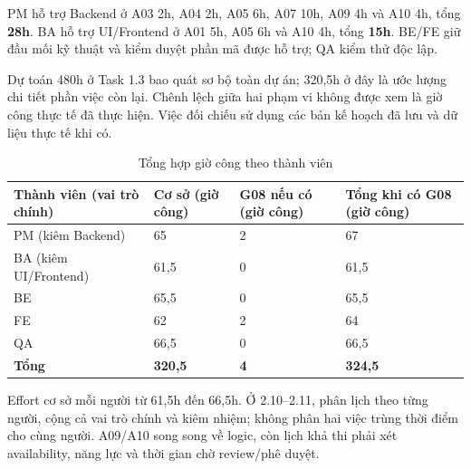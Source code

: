 PM hỗ trợ Backend ở A03 2h, A04 2h, A05 6h, A07 10h, A09 4h và A10 4h, tổng \textbf{28h}. BA hỗ trợ UI/Frontend ở A01 5h, A05 6h và A10 4h, tổng \textbf{15h}. BE/FE giữ đầu mối kỹ thuật và kiểm duyệt phần mã được hỗ trợ; QA kiểm thử độc lập.

Dự toán 480h ở Task 1.3 bao quát sơ bộ toàn dự án; 320,5h ở đây là ước lượng chi tiết phần việc còn lại. Chênh lệch giữa hai phạm vi không được xem là giờ công thực tế đã thực hiện. Việc đối chiếu sử dụng các bản kế hoạch đã lưu và dữ liệu thực tế khi có.

\begin{table}[H]
\centering
\caption{Tổng hợp giờ công theo thành viên}
\small
\renewcommand{\arraystretch}{1.25}
\begin{tabularx}{\linewidth}{|p{3cm}|X|X|X|}
\hline
\textbf{Thành viên (vai trò chính)} & \textbf{Cơ sở (giờ công)} & \textbf{G08 nếu có (giờ công)} & \textbf{Tổng khi có G08 (giờ công)} \\ \hline
PM (kiêm Backend) & 65 & 2 & 67 \\ \hline
BA (kiêm UI/Frontend) & 61,5 & 0 & 61,5 \\ \hline
BE & 65,5 & 0 & 65,5 \\ \hline
FE & 62 & 2 & 64 \\ \hline
QA & 66,5 & 0 & 66,5 \\ \hline

\textbf{Tổng} & \textbf{320,5} & \textbf{4} & \textbf{324,5} \\ \hline
\end{tabularx}
\end{table}
\noindent Effort cơ sở mỗi người từ 61,5h đến 66,5h. Ở 2.10--2.11, phân lịch theo từng người, cộng cả vai trò chính và kiêm nhiệm; không phân hai việc trùng thời điểm cho cùng người. A09/A10 song song về logic, còn lịch khả thi phải xét availability, năng lực và thời gian chờ review/phê duyệt.
